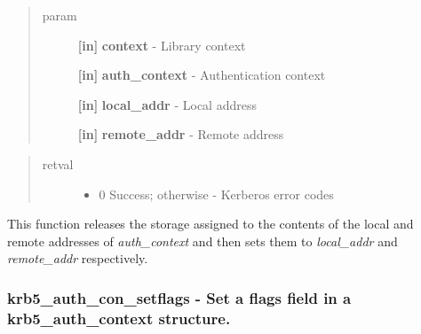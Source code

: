 \documentclass[letterpaper,10pt,english]{sphinxmanual}
\begin{document}
\begin{fulllineitems}
\label{appdev/refs/api/krb5_auth_con_setaddrs:c.krb5_auth_con_setaddrs}
\end{fulllineitems}

\begin{quote}\begin{description}
\item[{param}] \leavevmode
\textbf{{[}in{]}} \textbf{context} - Library context

\textbf{{[}in{]}} \textbf{auth\_context} - Authentication context

\textbf{{[}in{]}} \textbf{local\_addr} - Local address

\textbf{{[}in{]}} \textbf{remote\_addr} - Remote address

\end{description}\end{quote}
\begin{quote}\begin{description}
\item[{retval}] \leavevmode\begin{itemize}
\item {} 
0   Success; otherwise - Kerberos error codes

\end{itemize}

\end{description}\end{quote}

This function releases the storage assigned to the contents of the local and remote addresses of \emph{auth\_context} and then sets them to \emph{local\_addr} and \emph{remote\_addr} respectively.




{\hyperref[appdev/refs/api/krb5_auth_con_genaddrs:c.krb5_auth_con_genaddrs]{}}




\subsubsection{krb5\_auth\_con\_setflags -  Set a flags field in a krb5\_auth\_context structure.}
\label{appdev/refs/api/krb5_auth_con_setflags:krb5-auth-con-setflags-set-a-flags-field-in-a-krb5-auth-context-structure}\label{appdev/refs/api/krb5_auth_con_setflags::doc}
\end{document}
